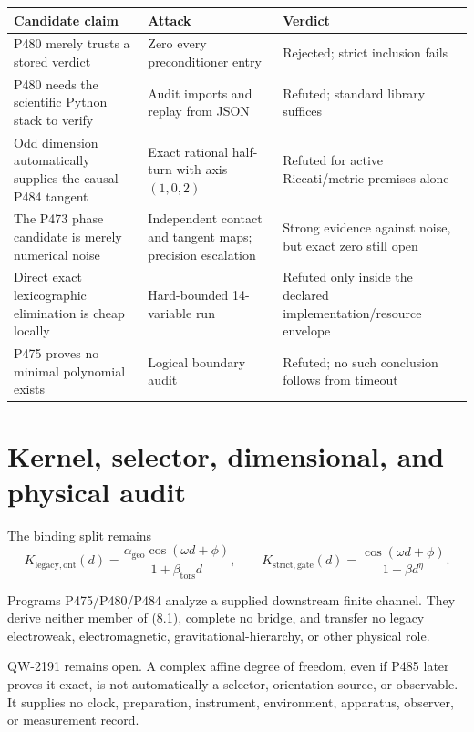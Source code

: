\documentclass[11pt,a4paper,openany]{report}
\begin{document}
\begin{center}\small
\begin{longtable}{@{}p{}p{}p{}@{}}
\toprule
\textbf{Candidate claim} & \textbf{Attack} & \textbf{Verdict}\\ \midrule\endhead
P480 merely trusts a stored verdict & Zero every preconditioner entry & Rejected; strict inclusion fails\\
P480 needs the scientific Python stack to verify & Audit imports and replay from JSON & Refuted; standard library suffices\\
Odd dimension automatically supplies the causal P484 tangent & Exact rational half-turn with axis \((1,0,2)\) & Refuted for active Riccati/metric premises alone\\
The P473 phase candidate is merely numerical noise & Independent contact and tangent maps; precision escalation & Strong evidence against noise, but exact zero still open\\
Direct exact lexicographic elimination is cheap locally & Hard-bounded 14-variable run & Refuted only inside the declared implementation/resource envelope\\
P475 proves no minimal polynomial exists & Logical boundary audit & Refuted; no such conclusion follows from timeout\\
\bottomrule
\end{longtable}
\end{center}

\chapter{Kernel, selector, dimensional, and physical audit}

The binding split remains
\[
 K_{\mathrm{legacy,ont}}(d)=
 \frac{\alpha_{\mathrm{geo}}\cos(\omega d+\phi)}
      {1+\beta_{\mathrm{tors}}d},
 \qquad
 K_{\mathrm{strict,gate}}(d)=
 \frac{\cos(\omega d+\phi)}{1+\beta d^\eta}.                      \tag{8.1}
\]

Programs P475/P480/P484 analyze a supplied downstream finite channel. They
derive neither member of (8.1), complete no bridge, and transfer no legacy
electroweak, electromagnetic, gravitational-hierarchy, or other physical
role.

QW-2191 remains open. A complex affine degree of freedom, even if P485 later
proves it exact, is not automatically a selector, orientation source, or
observable. It supplies no clock, preparation, instrument, environment,
apparatus, observer, or measurement record.
\end{document}
